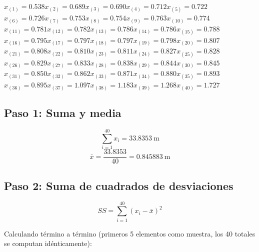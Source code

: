 \documentclass[12pt,a4paper,oneside]{book}
\begin{document}
\begin{tcolorbox}[colback=lightgray, colframe=primary, boxrule=0.5pt]
\small
$x_{(1)}=0.538$\quad $x_{(2)}=0.689$\quad $x_{(3)}=0.690$\quad $x_{(4)}=0.712$\quad $x_{(5)}=0.722$\quad \\
$x_{(6)}=0.726$\quad $x_{(7)}=0.753$\quad $x_{(8)}=0.754$\quad $x_{(9)}=0.763$\quad $x_{(10)}=0.774$\quad \\
$x_{(11)}=0.781$\quad $x_{(12)}=0.782$\quad $x_{(13)}=0.786$\quad $x_{(14)}=0.786$\quad $x_{(15)}=0.788$\quad \\
$x_{(16)}=0.795$\quad $x_{(17)}=0.797$\quad $x_{(18)}=0.797$\quad $x_{(19)}=0.798$\quad $x_{(20)}=0.807$\quad \\
$x_{(21)}=0.808$\quad $x_{(22)}=0.810$\quad $x_{(23)}=0.811$\quad $x_{(24)}=0.827$\quad $x_{(25)}=0.828$\quad \\
$x_{(26)}=0.829$\quad $x_{(27)}=0.833$\quad $x_{(28)}=0.838$\quad $x_{(29)}=0.844$\quad $x_{(30)}=0.845$\quad \\
$x_{(31)}=0.850$\quad $x_{(32)}=0.862$\quad $x_{(33)}=0.871$\quad $x_{(34)}=0.880$\quad $x_{(35)}=0.893$\quad \\
$x_{(36)}=0.895$\quad $x_{(37)}=1.097$\quad $x_{(38)}=1.183$\quad $x_{(39)}=1.268$\quad $x_{(40)}=1.727$\quad \\

\end{tcolorbox}

\subsection{Paso 1: Suma y media}

\begin{equation}
\sum_{i=1}^{40} x_i = 33.8353\ \mathrm{m}
\end{equation}
\begin{equation}
\bar{x} = \frac{33.8353}{40} = 0.845883\ \mathrm{m}
\end{equation}

\subsection{Paso 2: Suma de cuadrados de desviaciones}

\begin{equation}
SS = \sum_{i=1}^{40}(x_i - \bar{x})^2
\end{equation}

Calculando término a término (primeros 5 elementos como muestra, los 40 totales se computan idénticamente):
\end{document}
